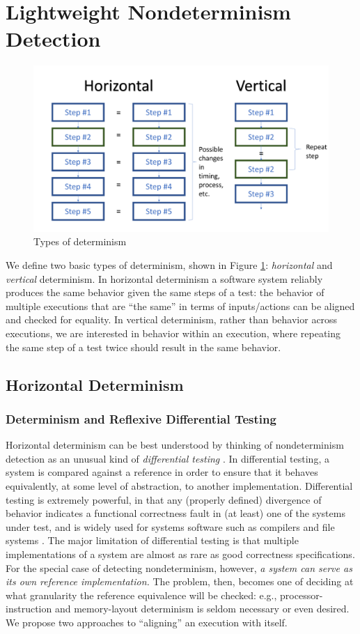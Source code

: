 \section{Lightweight Nondeterminism
  Detection}

\begin{figure}
  \centering
\includegraphics[width=0.6\columnwidth]{types}
\caption{Types of determinism}
\label{fig:types}
\end{figure}

We define two basic types of determinism, shown in Figure
\ref{fig:types}:  \emph{horizontal} and \emph{vertical} determinism.  In
horizontal determinism a software system reliably
produces the same behavior given the same steps of a test: the
behavior of multiple executions that are ``the same'' in terms of
inputs/actions can be aligned and checked for equality.  In
vertical determinism, rather than behavior across executions, we are
interested in behavior within an execution, where repeating the same
step of a test twice should result in the same behavior.  

\subsection{Horizontal Determinism}


\subsubsection{Determinism and Reflexive Differential Testing}

Horizontal determinism can be best understood by thinking of
nondeterminism detection as an unusual kind of \emph{differential
  testing} \cite{Differential}.  In differential testing, a
system is compared against a reference in order to ensure that
it behaves equivalently, at some level of abstraction, to another
implementation.  Differential testing is
extremely powerful, in that any (properly defined) divergence of
behavior indicates a functional correctness fault in (at
least) one of the systems under test, and  is widely
used for systems software such as compilers
\cite{Differential,csmith} and file systems \cite{AMAI}.  The major limitation of differential
testing is that multiple implementations of a system are
almost as rare as good correctness specifications.
For the special case of detecting nondeterminism, however, \emph{a
  system can serve as its own reference implementation.}    The
problem, then, becomes one of deciding at what granularity the
reference equivalence will be checked:  e.g., 
processor-instruction and memory-layout determinism is seldom
necessary or even desired.  We propose two approaches to ``aligning'' an
execution with itself.

